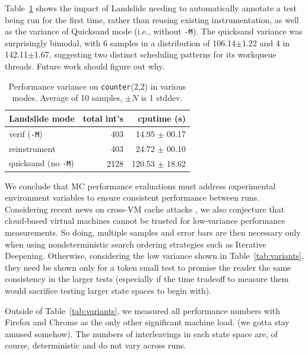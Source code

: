 \documentclass[10pt]{sigplanconf}
\begin{document}
Table~\ref{tab:variants2} shows
the impact of Landslide needing to automatically annotate a test being run for the first time,
rather than reusing existing instrumentation,
as well as the variance of Quicksand mode (i.e., without {\tt -M}).
The {\sf quicksand} variance was surprisingly bimodal,
with 6 samples in a distribution of 106.14$\pm$1.22 and 4 in 142.11$\pm$1.67,
suggesting two distinct scheduling patterns for its workqueue threads.
Future work should figure out why.

\begin{table}[t]
	\begin{center}
	\begin{tabular}{l|r|r}
		Landslide mode & total int's & cputime (s) \\
		\hline
		{\sf verif} ({\tt -M})		& 403 & 14.95 $\pm$ 00.17	\\
		{\sf reinstrument}		& 403 & 24.72 $\pm$ 00.10	\\
		{\sf quicksand} (no {\tt -M})	& 2128 & 120.53 $\pm$ 18.62	\\
	\end{tabular}
	\end{center}
	\caption{Performance variance on {\tt counter}(2,2) in various modes.
		Average of 10 samples, $\pm N$ is 1 stddev.
	}
	\label{tab:variants2}
\end{table}

We conclude that MC performance evaluations must address
experimental environment variables
to ensure consistent performance between runs.
Considering recent news on cross-VM cache attacks \cite{meltdown,spectre},
we also conjecture that cloud-based virtual machines cannot be trusted for low-variance performance measurements.
So doing, multiple samples and error bars are then necessary
only when using nondeterministic search ordering strategies
such as Iterative Deepening.
Otherwise, considering the low variance shown in Table~\ref{tab:variants},
they need be shown only for a token small test
to promise the reader the same consistency in the larger tests
(especially if the time tradeoff to measure them would sacrifice testing larger state spaces to begin with).

Outside of Table~\ref{tab:variants}, we measured all performance numbers
with Firefox and Chrome as the only other significant machine load.
(we gotta stay amused somehow).
The numbers of interleavings in each state space are, of course, deterministic and do not vary across runs.
\end{document}
